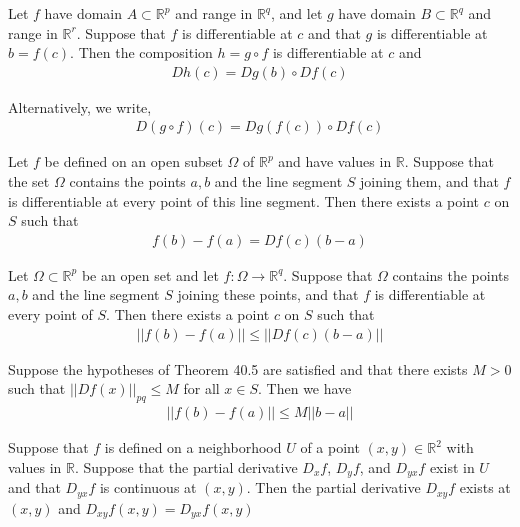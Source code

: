 \documentclass[12pt]{article}
\newcommand{\R}{\mathbb{R}}
\newenvironment{theorem}[2][Theorem]{\begin{trivlist}
\item[\hskip \labelsep {\bfseries #1}\hskip \labelsep {\bfseries #2.}]}{\end{trivlist}}
\newenvironment{corollary}[2][Corollary]{\begin{trivlist}
\item[\hskip \labelsep {\bfseries #1}\hskip \labelsep {\bfseries #2.}]}{\end{trivlist}}
\begin{document}
\begin{theorem}[Chain]{Rule}
Let $f$ have domain $A \subset \R^p$ and range in $\R^q$, and let $g$ have domain $B \subset \R^q$ and range in $\R^r$. Suppose that $f$ is differentiable at $c$ and that $g$ is differentiable at $b = f(c)$. Then the composition $h = g \circ f$ is differentiable at $c$ and
\begin{align*}
Dh(c) = Dg(b) \circ Df(c)
\end{align*}

Alternatively, we write,
\begin{align*}
D(g \circ f)(c) = Dg(f(c)) \circ Df(c)
\end{align*}
\end{theorem}

\begin{theorem}[Mean Value Theorem]{40.4}
Let $f$ be defined on an open subset $\Omega$ of $\R^p$ and have values in $\R$. Suppose that the set $\Omega$ contains the points $a, b$ and the line segment $S$ joining them, and that $f$ is differentiable at every point of this line segment. Then there exists a point $c$ on $S$ such that
\begin{align*}
f(b) - f(a) = Df(c)(b-a)
\end{align*}
\end{theorem}

\begin{theorem}[Mean Value Theorem]{40.5}
Let $\Omega \subset \R^p$ be an open set and let $f: \Omega \to \R^q$. Suppose that $\Omega$ contains the points $a, b$ and the line segment $S$ joining these points, and that $f$ is differentiable at every point of $S$. Then there exists a point $c$ on $S$ such that
\begin{align*}
||f(b) - f(a)|| \leq ||Df(c)(b - a)||
\end{align*}
\end{theorem}

\begin{corollary}{40.6}
Suppose the hypotheses of Theorem 40.5 are satisfied and that there exists $M > 0$ such that $||Df(x)||_{pq} \leq M$ for all $x \in S$. Then we have
\begin{align*}
||f(b) - f(a)|| \leq M||b-a||
\end{align*}
\end{corollary}

\begin{theorem}{40.8}
Suppose that $f$ is defined on a neighborhood $U$ of a point $(x, y) \in \R^2$ with values in $\R$. Suppose that the partial derivative $D_xf$, $D_yf$, and $D_{yx}f$ exist in $U$ and that $D_{yx}f$ is continuous at $(x, y)$. Then the partial derivative $D_{xy}f$ exists at $(x, y)$ and $D_{xy}f(x, y) = D_{yx}f(x, y)$
\end{theorem}
\end{document}
